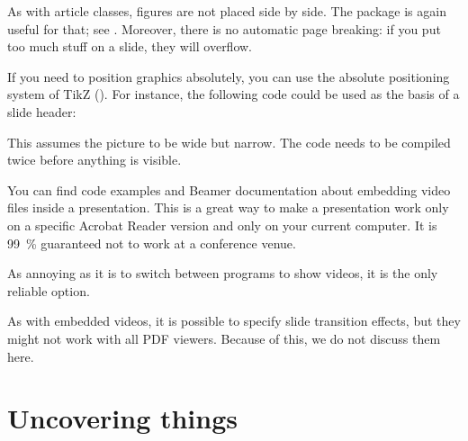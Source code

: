 \begin{gotcha}
As with article classes, figures are not placed side by side.
The  package is again useful for that;
see .
Moreover, there is no automatic page breaking:
if you put too much stuff on a slide, they will overflow.
\end{gotcha}


If you need to position graphics absolutely,
you can use the absolute positioning system of TikZ ().
For instance, the following code could be used as the basis of a slide header:
\begin{ExampleCode}
\end{ExampleCode}
This assumes the picture to be wide but narrow.
The code needs to be compiled twice before anything is visible.


\begin{warning}
You can find code examples and Beamer documentation about embedding video files inside a presentation.
This is a great way to make a presentation work only on a specific Acrobat Reader version
and only on your current computer.
It is 99~\% guaranteed not to work at a conference venue.

As annoying as it is to switch between programs to show videos,
it is the only reliable option.
\end{warning}

\begin{technote}
As with embedded videos, it is possible to specify slide transition effects,
but they might not work with all PDF viewers.
Because of this, we do not discuss them here.
\end{technote}



%
%
\section{Uncovering things}

